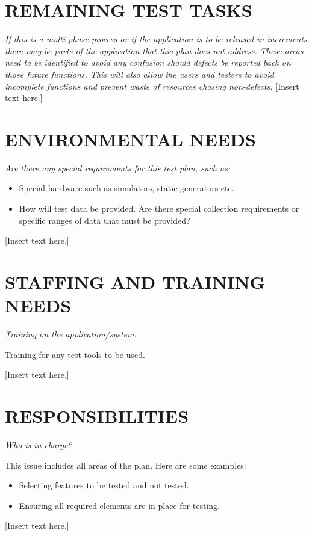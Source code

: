 \documentclass[twoside,letterpaper]{article}
\begin{document}
\section[REMAINING TEST TASKS]{\bfseries\color{black} REMAINING TEST TASKS}
{\itshape\color{black}
If this is a multi-phase process or if the application is to be
released in increments there may be parts of the application that this
plan does not address. These areas need to be identified to avoid any
confusion should defects be reported back on those future
functions. This will also allow the users and testers to avoid
incomplete functions and prevent waste of resources chasing non-defects.
}
{\color{black}
[Insert text here.]}

\section[ENVIRONMENTAL NEEDS]{\bfseries\color{black} ENVIRONMENTAL NEEDS}
{\itshape\color{black}
Are there any special requirements for this test plan, such as:

\begin{itemize}
\item Special hardware such as simulators, static generators etc.
\item How will test data be provided. Are there special collection
	requirements or specific ranges of data that must be provided? 
\end{itemize}

}
{\color{black}
[Insert text here.]}

\section[STAFFING AND TRAINING NEEDS]{\bfseries\color{black}
	 STAFFING AND TRAINING NEEDS}
{\itshape\color{black}
Training on the application/system.

Training for any test tools to be used. 
}
{\color{black}
[Insert text here.]}

\section[RESPONSIBILITIES]{\bfseries\color{black} RESPONSIBILITIES}
{\itshape\color{black}
Who is in charge?

This issue includes all areas of the plan. Here are some examples:

\begin{itemize}
\item Selecting features to be tested and not tested.
\item Ensuring all required elements are in place for testing. 
\end{itemize}
}
{\color{black}
[Insert text here.]}
\end{document}

